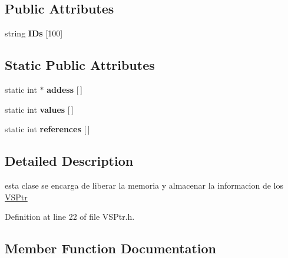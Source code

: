 \subsection*{Public Attributes}
\begin{DoxyCompactItemize}
\item 
\mbox{\label{classGarbageCollector_aaa9d40687613f1f5bed1eade53d2fa0e}} 
string {\bfseries I\+Ds} \mbox{[}100\mbox{]}
\end{DoxyCompactItemize}
\subsection*{Static Public Attributes}
\begin{DoxyCompactItemize}
\item 
\mbox{\label{classGarbageCollector_abcbb69dfa9db0805652dc45f7911a4cc}} 
static int $\ast$ {\bfseries addess} \mbox{[}$\,$\mbox{]}
\item 
\mbox{\label{classGarbageCollector_a4f8929a0249ad8c1dafd6448e39a4809}} 
static int {\bfseries values} \mbox{[}$\,$\mbox{]}
\item 
\mbox{\label{classGarbageCollector_a5e65ad48d134c7c3ae82ee90d50f87ae}} 
static int {\bfseries references} \mbox{[}$\,$\mbox{]}
\end{DoxyCompactItemize}


\subsection{Detailed Description}
esta clase se encarga de liberar la memoria y almacenar la informacion de los \hyperlink{classVSPtr}{V\+S\+Ptr} 

Definition at line 22 of file V\+S\+Ptr.\+h.



\subsection{Member Function Documentation}
\mbox{\label{classGarbageCollector_acaa683eb8aa51ce85ff5a8e3dbe17bd8}} 

